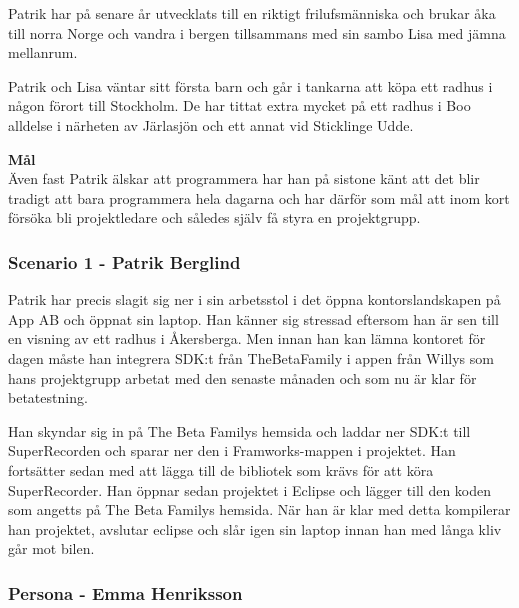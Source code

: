 Patrik har på senare år utvecklats till en riktigt frilufsmänniska och brukar åka till norra Norge och vandra i bergen tillsammans med sin sambo Lisa med jämna mellanrum.

Patrik och Lisa väntar sitt första barn och går i tankarna att köpa ett radhus i någon förort till Stockholm. De har tittat extra mycket på ett radhus i Boo alldelse i närheten av Järlasjön och ett annat vid Sticklinge Udde.

\textbf{Mål}\\
Även fast Patrik älskar att programmera har han på sistone känt att det blir tradigt att bara programmera hela dagarna och har därför som mål att inom kort försöka bli projektledare och således själv få styra en projektgrupp.
\newpage

\subsubsection{Scenario 1 - Patrik Berglind}
Patrik har precis slagit sig ner i sin arbetsstol i det öppna kontorslandskapen på App AB och öppnat sin laptop. Han känner sig stressad eftersom han är sen till en visning av ett radhus i Åkersberga. Men innan han kan lämna kontoret för dagen måste han integrera SDK:t från TheBetaFamily i appen från Willys som hans projektgrupp arbetat med den senaste månaden och som nu är klar för betatestning.

Han skyndar sig in på The Beta Familys hemsida och laddar ner SDK:t till SuperRecorden och sparar ner den i Framworks-mappen i projektet. Han fortsätter sedan med att lägga till de bibliotek som krävs för att köra SuperRecorder. Han öppnar sedan projektet i Eclipse och lägger till den koden som angetts på The Beta Familys hemsida. När han är klar med detta kompilerar han projektet, avslutar eclipse och slår igen sin laptop innan han med långa kliv går mot bilen.
\newpage
\subsubsection{Persona - Emma Henriksson}

\vspace{40px}

